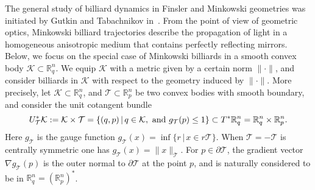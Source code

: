 \documentclass{icmart}
\theoremstyle{definition}
\begin{document}
\smallskip

The general study of billiard dynamics in Finsler  and Minkowski
geometries was initiated by Gutkin and Tabachnikov in~\cite{GT}. From the point of view of geometric optics, Minkowski billiard
trajectories describe the propagation of light in a homogeneous
anisotropic medium that contains perfectly reflecting mirrors. %
Below, we focus on the special case of Minkowski billiards in a smooth convex
body  ${\mathcal K} \subset {\mathbb R}^n_q$. %
We equip ${\mathcal K}$
with a metric given by a certain norm $\| \cdot \|$, and
consider billiards in ${\mathcal K}$ with respect to the geometry induced by $\| \cdot \|$.
More precisely, let ${\mathcal K} \subset {\mathbb R}^n_q$, and ${\mathcal T}  \subset {\mathbb R}^n_p$ be two convex bodies with smooth boundary, and consider the 
unit cotangent bundle
\begin{equation*}
U_{\mathcal  T}^*{\mathcal K} := {\mathcal K}  \times {\mathcal T} = \{ (q,p) \, | \, q \in {\mathcal K}, \ {\rm and} \
g_{\mathcal T} (p)  \leq 1 \} \subset  T^* {\mathbb R}^n_q  = {\mathbb R}^{n}_q
\times  {\mathbb R}^{n}_p. \end{equation*} Here $g_{\mathcal T}$ is the gauge function %
$g_{\mathcal T}(x) = \inf \{r  \, | \, x \in r {\mathcal T} \}$. %
When ${\mathcal T}=-{\mathcal T}$ is centrally symmetric  %
  one has $g_{\mathcal T}(x) = \|x\|_{\mathcal T}$.
For $p \in \partial {\mathcal T}$, the gradient vector $\nabla g_{\mathcal T}(p)$ is the outer normal to $\partial {\mathcal T}$ at the point $p$,  and is naturally considered to be in $\mathbb R^n_q = (\mathbb R^n_p)^* $.

\smallskip
\end{document}
